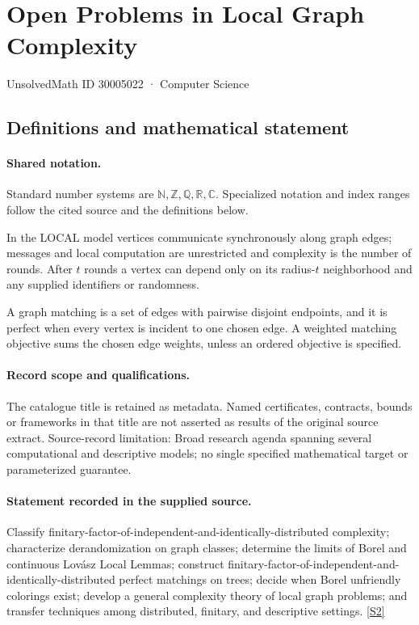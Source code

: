 \documentclass[11pt]{article}
\newcommand{\sref}[2]{\hyperlink{source:#1:#2}{[S#2]}}
\begin{document}
\setcounter{section}{30005021}
\section{Open Problems in Local Graph Complexity}\label{30005022}
{\small\sffamily UnsolvedMath ID 30005022 · Computer Science}
\subsection{Definitions and mathematical statement}

\paragraph{Shared notation.}Standard number systems are $\mathbb N,\mathbb Z,\mathbb Q,\mathbb R,\mathbb C$. Specialized notation and index ranges follow the cited source and the definitions below.


In the LOCAL model vertices communicate synchronously along graph edges; messages and local computation are unrestricted and complexity is the number of rounds. After $t$ rounds a vertex can depend only on its radius-$t$ neighborhood and any supplied identifiers or randomness.

A graph matching is a set of edges with pairwise disjoint endpoints, and it is perfect when every vertex is incident to one chosen edge. A weighted matching objective sums the chosen edge weights, unless an ordered objective is specified.
\paragraph{Record scope and qualifications.}
The catalogue title is retained as metadata. Named certificates, contracts, bounds or frameworks in that title are not asserted as results of the original source extract.
Source-record limitation: Broad research agenda spanning several computational and descriptive models; no single specified mathematical target or parameterized guarantee.
\paragraph{Statement recorded in the supplied source.}
Classify finitary-factor-of-independent-and-identically-distributed complexity; characterize derandomization on graph classes; determine the limits of Borel and continuous Lovász Local Lemmas; construct finitary-factor-of-independent-and-identically-distributed perfect matchings on trees; decide when Borel unfriendly colorings exist; develop a general complexity theory of local graph problems; and transfer techniques among distributed, finitary, and descriptive settings. \sref{30005022}{2}
\end{document}

